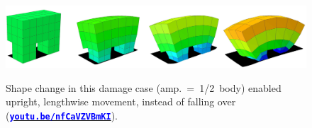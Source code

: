 \begin{figure}[h!]
\begin{center}
\includegraphics[trim={0 0 0 0},clip,width=\linewidth]{Chapter05/fig/scruncher.jpg}\\
\caption{\label{fig:scruncher}
Shape change in this damage case (amp.~=~1/2~body) enabled upright, lengthwise movement, instead of falling over
(\href{https://youtu.be/nfCaVZVBmKI}{\textcolor{blue}{\textbf{\texttt{youtu.be/nfCaVZVBmKI}}}}).
}
\vspace{-1em}
\end{center}
\end{figure}